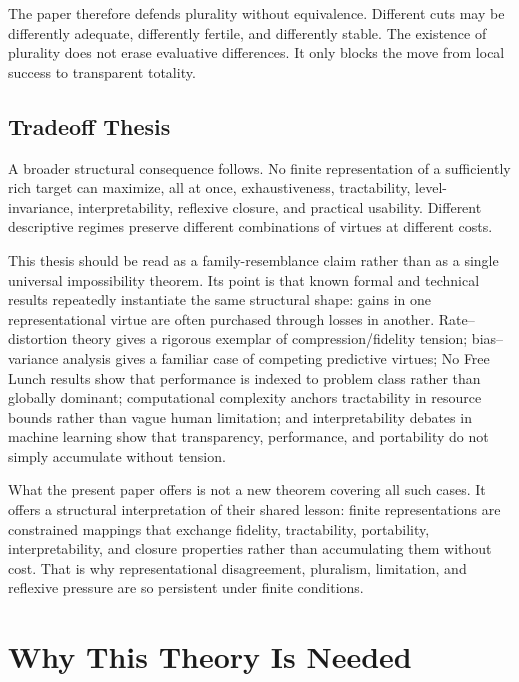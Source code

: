 \documentclass[11pt]{article}
\begin{document}
The paper therefore defends plurality without equivalence. Different cuts may be differently adequate, differently fertile, and differently stable. The existence of plurality does not erase evaluative differences. It only blocks the move from local success to transparent totality.

\subsection{Tradeoff Thesis}

A broader structural consequence follows. No finite representation of a sufficiently rich target can maximize, all at once, exhaustiveness, tractability, level-invariance, interpretability, reflexive closure, and practical usability. Different descriptive regimes preserve different combinations of virtues at different costs. \cite{frigg_hartmann_models_sep,adriaans_information_sep}

This thesis should be read as a family-resemblance claim rather than as a single universal impossibility theorem. Its point is that known formal and technical results repeatedly instantiate the same structural shape: gains in one representational virtue are often purchased through losses in another. Rate--distortion theory gives a rigorous exemplar of compression/fidelity tension; bias--variance analysis gives a familiar case of competing predictive virtues; No Free Lunch results show that performance is indexed to problem class rather than globally dominant; computational complexity anchors tractability in resource bounds rather than vague human limitation; and interpretability debates in machine learning show that transparency, performance, and portability do not simply accumulate without tension. \cite{shannon_rate_distortion,geman_bias_variance,wolpert_no_free_lunch,arora_barak_complexity,rudin_interpretable_models,lipton_mythos_interpretability}

What the present paper offers is not a new theorem covering all such cases. It offers a structural interpretation of their shared lesson: finite representations are constrained mappings that exchange fidelity, tractability, portability, interpretability, and closure properties rather than accumulating them without cost. That is why representational disagreement, pluralism, limitation, and reflexive pressure are so persistent under finite conditions.
\section{Why This Theory Is Needed}
\end{document}
